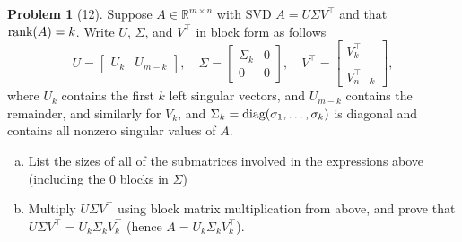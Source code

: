 \documentclass{amsart}[11pt]
\theoremstyle{definition}
\newtheorem*{problem}{Problem}
\newcommand{\R}{\mathbb{R}}
\newcommand{\rank}{\textnormal{rank}}
\newcommand{\diag}{\textnormal{diag}}
\begin{document}
\begin{problem}[12]
Suppose $A\in\R^{m\times n}$ with SVD $A=U\Sigma V^\top$ and that $\rank(A)=k$.  Write $U$, $\Sigma$, and $V^\top$ in block form as follows
\[ U = \begin{bmatrix} U_k & U_{m-k}\end{bmatrix},\quad \Sigma = \begin{bmatrix} \Sigma_k & 0\\0 & 0\end{bmatrix},\quad V^\top = \begin{bmatrix} V_k^\top \\\\ V_{n-k}^\top\end{bmatrix}, \]
where $U_k$ contains the first $k$ left singular vectors, and $U_{m-k}$ contains the remainder, and similarly for $V_k$, and $\Sigma_k = \diag(\sigma_1,\dots,\sigma_k)$ is diagonal and contains all nonzero singular values of $A$.

\begin{enumerate}[(a)]
\item List the sizes of all of the submatrices involved in the expressions above (including the $0$ blocks in $\Sigma$)
\item Multiply $U\Sigma V^\top$ using block matrix multiplication from above, and prove that $U\Sigma V^\top = U_k\Sigma_kV_k^\top$ (hence $A=U_k\Sigma_kV_k^\top$).
\end{enumerate}
\end{problem}
\end{document}
